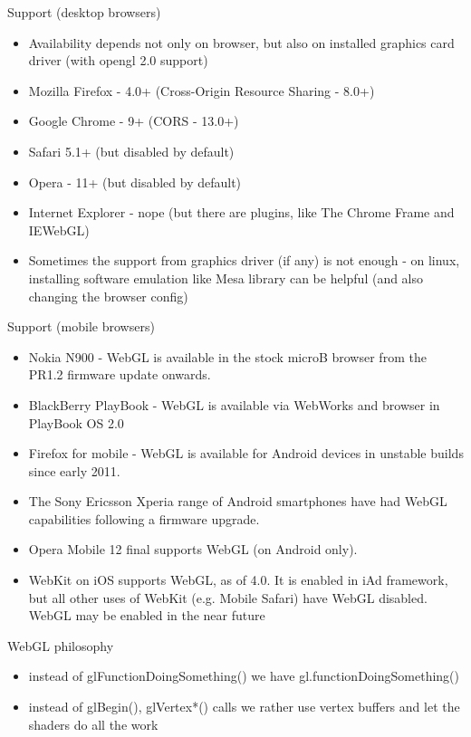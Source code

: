 \documentclass{beamer}
\begin{document}
\begin{frame}{Support (desktop browsers)}

\begin{itemize}
\item Availability depends not only on browser, but also on installed graphics card driver (with opengl 2.0 support)
\item Mozilla Firefox - 4.0+ (Cross-Origin Resource Sharing - 8.0+)
\item Google Chrome - 9+ (CORS - 13.0+)
\item Safari 5.1+ (but disabled by default)
\item Opera - 11+ (but disabled by default)
\item Internet Explorer - nope (but there are plugins, like The Chrome Frame and IEWebGL)

\item Sometimes the support from graphics driver (if any) is not enough - on
linux, installing software emulation like Mesa library can be helpful (and also changing the browser config)
\end{itemize}

\end{frame}


\begin{frame}{Support (mobile browsers)}

\begin{itemize}
\item Nokia N900 - WebGL is available in the stock microB browser from the PR1.2 firmware update onwards.
\item BlackBerry PlayBook - WebGL is available via WebWorks and browser in PlayBook OS 2.0
\item Firefox for mobile - WebGL is available for Android devices in unstable builds since early 2011.
\item The Sony Ericsson Xperia range of Android smartphones have had WebGL capabilities following a firmware upgrade.
\item Opera Mobile 12 final supports WebGL (on Android only).
\item WebKit on iOS supports WebGL, as of 4.0. It is enabled in iAd framework, but all other uses of WebKit (e.g. Mobile Safari) have WebGL disabled. WebGL may be enabled in the near future
\end{itemize}

\end{frame}


\begin{frame}{WebGL philosophy}

\begin{itemize}
\item instead of glFunctionDoingSomething() we have gl.functionDoingSomething()
\item instead of glBegin(), glVertex*() calls we rather use vertex buffers and
let the shaders do all the work
\end{itemize}

\end{frame}
\end{document}
